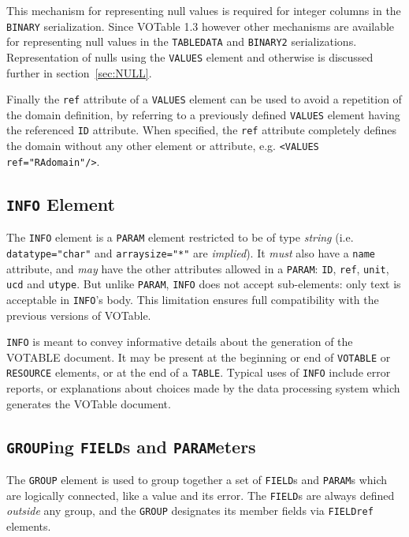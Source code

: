 \documentclass[11pt,a4paper]{ivoa}
\def\Aref#1{section~\ref{#1}}
\let\fg=\color
\def\slash {{\fg{blue}/}}
\def\attr#1{{\tt{\fg{DarkRed}#1}}}
\def\elem#1{{\tt{\fg{DarkRed}#1}}}
\def\attrval#1#2{{\tt{\fg{DarkRed}#1}="{\fg{DarkPurple}#2}"}}
\def\elemdef#1#2{{\tt\fg{blue}<}{\tt{\fg{DarkRed}#1}#2}{\tt\fg{blue}>}}
\begin{document}
This mechanism for representing null values is required for integer
columns in the \elem{BINARY} serialization.
Since VOTable 1.3 however other mechanisms are available for representing
null values in the \elem{TABLEDATA} and \elem{BINARY2} serializations.
Representation of nulls using the \elem{VALUES} element and otherwise
is discussed further in \Aref{sec:NULL}.

Finally the \attr{ref} attribute of a \elem{VALUES} element
can be used to avoid a repetition of the domain definition,
by referring to a previously defined \elem{VALUES} element
having the referenced \attr{ID} attribute.
When specified, the  \attr{ref} attribute completely defines
the domain without any other element or attribute, e.g.
\elemdef{VALUES}{ \attrval{ref}{RAdomain}\slash}.

\subsection{\elem{INFO} Element}
\label{elem:INFO}
The \elem{INFO} element is a {\elem{PARAM}} element restricted
to be of type {\em string}
(i.e. \attrval{datatype}{char} and \attrval{arraysize}{*} are {\em implied}).
It {\em must} also have a \attr{name} attribute,
and {\em may} have the other attributes allowed in a \elem{PARAM}:
\attr{ID}, \attr{ref}, \attr{unit}, \attr{ucd} and \attr{utype}.
But unlike \elem{PARAM}, \elem{INFO} does not accept sub-elements:
only text is acceptable in \elem{INFO}'s body. This limitation ensures full
compatibility with the previous versions of VOTable.

\elem{INFO} is meant to convey informative details about the
generation of the {VOTABLE} document.
It may be present
at the beginning or end of \elem{VOTABLE} or \elem{RESOURCE} elements,
or at the end of a \elem{TABLE}. Typical uses of \elem{INFO}
include error reports, or explanations about choices made by the
data processing system which generates the VOTable document.

\subsection{\elem{GROUP}ing \elem{FIELD}s and \elem{PARAM}eters}
\label{sec:group}
\label{elem:GROUP}
\label{elem:FIELDref}
\label{elem:PARAMref}

The \elem{GROUP} element is used
to group together a set of \elem{FIELD}s and \elem{PARAM}s
which are logically connected, like a value and its error.
The \elem{FIELD}s are always defined {\em outside} any group,
and the \elem{GROUP} designates its member fields via
\elem{FIELDref} elements.
\end{document}
